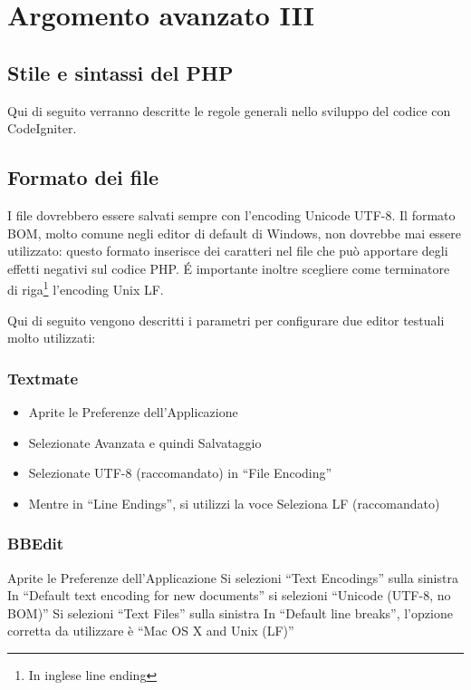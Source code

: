 \chapter{Argomento avanzato III}
\label{cap:stile}
\section{Stile e sintassi del PHP}
Qui di seguito verranno descritte le regole generali nello sviluppo del codice con CodeIgniter.

\section*{Formato dei file}
I file dovrebbero essere salvati sempre con l'encoding Unicode UTF-8. Il formato BOM, molto comune negli editor di default di Windows, non dovrebbe mai essere utilizzato: questo formato inserisce dei caratteri nel file che può apportare degli effetti negativi sul codice \ac{PHP}. \'E importante inoltre scegliere come terminatore di riga\footnote{In inglese line ending} l'encoding Unix LF.

Qui di seguito vengono descritti i parametri per configurare due editor testuali molto utilizzati:

\subsection*{Textmate}
\begin{itemize}
\item Aprite le Preferenze dell'Applicazione
\item Selezionate Avanzata e quindi Salvataggio
\item Selezionate UTF-8 (raccomandato) in ``File Encoding''
\item Mentre in ``Line Endings'', si utilizzi la voce Seleziona LF (raccomandato)
\end{itemize}

\subsection*{BBEdit}
Aprite le Preferenze dell'Applicazione
Si selezioni ``Text Encodings'' sulla sinistra
In ``Default text encoding for new documents'' si selezioni ``Unicode (UTF-8, no BOM)''
Si selezioni ``Text Files'' sulla sinistra
In ``Default line breaks'', l'opzione corretta da utilizzare è ``Mac OS X and Unix (LF)''

